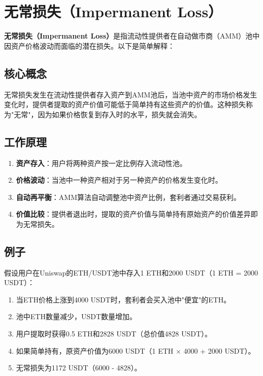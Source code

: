 \documentclass[12pt]{ctexart}
\begin{document}
\newpage
\section{无常损失（Impermanent Loss）}
\textbf{无常损失（Impermanent Loss）}是指流动性提供者在自动做市商（AMM）池中因资产价格波动而面临的潜在损失。以下是简单解释：

\subsection{核心概念}
无常损失发生在流动性提供者存入资产到AMM池后，当池中资产的市场价格发生变化时，提供者提取的资产价值可能低于简单持有这些资产的价值。这种损失称为"无常"，因为如果价格恢复到存入时的水平，损失就会消失。

\subsection{工作原理}
\begin{enumerate}
    \item \textbf{资产存入}：用户将两种资产按一定比例存入流动性池。
    \item \textbf{价格波动}：当池中一种资产相对于另一种资产的价格发生变化时。
    \item \textbf{自动再平衡}：AMM算法自动调整池中资产比例，套利者通过交易获利。
    \item \textbf{价值比较}：提供者退出时，提取的资产价值与简单持有原始资产的价值差异即为无常损失。
\end{enumerate}

\subsection{例子}
假设用户在Uniswap的ETH/USDT池中存入1 ETH和2000 USDT（1 ETH = 2000 USDT）：
\begin{enumerate}
    \item 当ETH价格上涨到4000 USDT时，套利者会买入池中"便宜"的ETH。
    \item 池中ETH数量减少，USDT数量增加。
    \item 用户提取时获得0.5 ETH和2828 USDT（总价值4828 USDT）。
    \item 如果简单持有，原资产价值为6000 USDT（1 ETH × 4000 + 2000 USDT）。
    \item 无常损失为1172 USDT（6000 - 4828）。
\end{enumerate}
\end{document}
